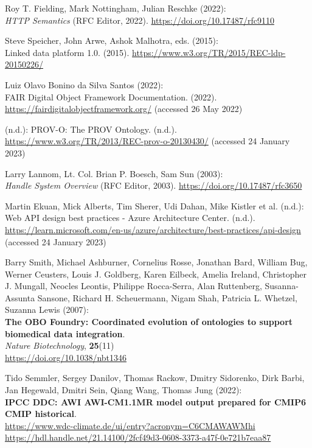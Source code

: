 \begin{thebibliography}{9}
Roy T. Fielding, Mark Nottingham, Julian Reschke (2022): \\
\emph{{HTTP Semantics}} ({RFC Editor}, 2022).
\url{https://doi.org/10.17487/rfc9110}

Steve Speicher, John Arwe, Ashok Malhotra, eds. (2015): \\
Linked data
platform 1.0. (2015). \url{https://www.w3.org/TR/2015/REC-ldp-20150226/}

Luiz Olavo Bonino da Silva Santos (2022): \\
{FAIR Digital Object Framework
Documentation}. (2022). \url{https://fairdigitalobjectframework.org/}
(accessed 26 May 2022)

(n.d.): {PROV-O}: {The PROV Ontology}. (n.d.).
\url{https://www.w3.org/TR/2013/REC-prov-o-20130430/} (accessed 24
January 2023)

Larry Lannom, Lt. Col. Brian P. Boesch, Sam Sun (2003): \\
\emph{Handle
{System Overview}} ({RFC Editor}, 2003).
\url{https://doi.org/10.17487/rfc3650}

Martin Ekuan, Mick Alberts, Tim Sherer, Udi Dahan, Mike Kistler et
al. (n.d.): Web {API} design best practices - {Azure Architecture
Center}. (n.d.).
\url{https://learn.microsoft.com/en-us/azure/architecture/best-practices/api-design}
(accessed 24 January 2023)

Barry Smith, Michael Ashburner, Cornelius Rosse, Jonathan Bard, William
Bug, Werner Ceusters, Louis J. Goldberg, Karen Eilbeck, Amelia Ireland,
Christopher J. Mungall, Neocles Leontis, Philippe Rocca-Serra, Alan
Ruttenberg, Susanna-Assunta Sansone, Richard H. Scheuermann, Nigam Shah,
Patricia L. Whetzel, Suzanna Lewis (2007): \\
\textbf{The {OBO Foundry}:
Coordinated evolution of ontologies to support biomedical data
integration}. \\
\emph{Nature Biotechnology}, \textbf{25}(11) \\
\url{https://doi.org/10.1038/nbt1346}

Tido Semmler, Sergey Danilov, Thomas Rackow, Dmitry Sidorenko, Dirk
Barbi, Jan Hegewald, Dmitri Sein, Qiang Wang, Thomas Jung (2022):\\
\textbf{IPCC DDC: AWI AWI-CM1.1MR model output prepared for CMIP6 CMIP
historical}. \\
\url{https://www.wdc-climate.de/ui/entry?acronym=C6CMAWAWMhi}\\
\url{https://hdl.handle.net/21.14100/2fcf49d3-0608-3373-a47f-0e721b7eaa87}


\end{thebibliography}
